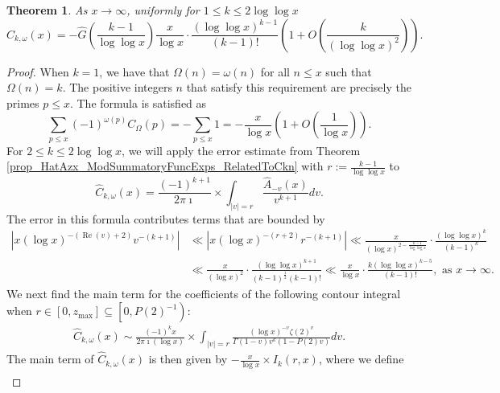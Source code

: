 \documentclass[11pt,reqno,a4letter]{article}
\newcommand{\hlocalref}[1]{\hyperref[#1]{\ref{#1}}}
\numberwithin{equation}{section}
\numberwithin{figure}{section}
\numberwithin{table}{section}
\theoremstyle{plain}
\newtheorem{theorem}{Theorem}
\numberwithin{theorem}{section}
\theoremstyle{definition}
\renewcommand{\Re}{\operatorname{Re}}
\begin{document}
\begin{theorem} 
\label{theorem_CnkSpCasesScaledSummatoryFuncs} 
As $x \rightarrow \infty$, uniformly for $1 \leq k \leq 2\log\log x$ 
\[
\widehat{C}_{k,\omega}(x) = -\widehat{G}\left(\frac{k-1}{\log\log x}\right) \frac{x}{\log x} \cdot 
     \frac{(\log\log x)^{k-1}}{(k-1)!} \left( 
     1 + O\left(\frac{k}{(\log\log x)^2}\right)\right). 
\]
\end{theorem} 
\begin{proof} 
When $k = 1$, we have that $\Omega(n) = \omega(n)$ for all $n \leq x$ such that $\Omega(n) = k$. 
The positive integers $n$ that satisfy this requirement are precisely the primes $p \leq x$. 
The formula is satisfied as 
\[
\sum_{p \leq x} (-1)^{\omega(p)} C_{\Omega}(p) = -\sum_{p \leq x} 1 = 
     - \frac{x}{\log x} \left(1 + O\left(\frac{1}{\log x}\right)\right). 
\]
For $2 \leq k \leq 2\log\log x$, we will apply the error estimate from 
Theorem \hlocalref{prop_HatAzx_ModSummatoryFuncExps_RelatedToCkn} with 
$r := \frac{k-1}{\log\log x}$ to
\[
\widehat{C}_{k,\omega}(x) = \frac{(-1)^{k+1}}{2\pi\imath} \times \int_{|v|=r} 
     \frac{\widehat{A}_{-v}(x)}{v^{k+1}} dv. 
\]
The error in this formula 
contributes terms that are bounded by 
\begin{align*} 
\left\lvert x (\log x)^{-(\Re(v)+2)} v^{-(k+1)} \right\rvert & \ll 
     \left\lvert x (\log x)^{-(r+2)} r^{-(k+1)} \right\rvert 
     \ll \frac{x}{(\log x)^{2-\frac{k-1}{\log\log x}}} \cdot 
     \frac{(\log\log x)^{k}}{(k-1)^{k}} \\ 
     & \ll \frac{x}{(\log x)^2} \cdot \frac{(\log\log x)^{k+1}}{(k-1)^{\frac{1}{2}} (k-1)!} 
     \ll \frac{x}{\log x} \cdot \frac{k (\log\log x)^{k-5}}{(k-1)!}, 
     \text{ as } x \rightarrow \infty. 
\end{align*} 
We next find the main term for the coefficients 
of the following contour integral when 
$r \in [0, z_{\max}] \subseteq \left[0, P(2)^{-1}\right)$: 
\begin{align} 
\label{eqn_WideTildeArx_CountourIntDef_v1} 
\widehat{C}_{k,\omega}(x) \sim  
     \frac{(-1)^{k} x}{2\pi\imath (\log x)} 
     \times \int_{|v|=r} \frac{(\log x)^{-v} \zeta(2)^{v}}{\Gamma(1 - v) 
     v^{k} (1 - P(2) v)} dv. 
\end{align} 
The main term of $\widehat{C}_{k,\omega}(x)$ 
is then given by $-\frac{x}{\log x} \times I_k(r, x)$, where we define 
\begin{align*}

\end{align*}
\end{proof}
\end{document}

